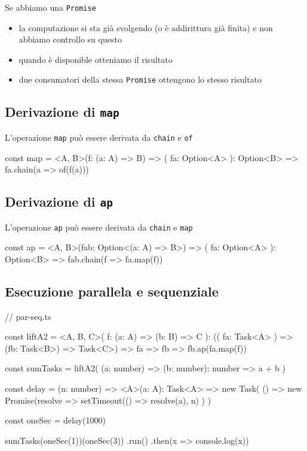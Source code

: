 \documentclass[12pt]{article}
\theoremstyle{definition}
\newenvironment{code}
  {\vspace{0.5cm} \VerbatimEnvironment\begin{typescriptcode}}
  {\end{typescriptcode} \vspace{0.2cm}}
\begin{document}
Se abbiamo una \texttt{Promise}

\begin{itemize}
  \item la computazione si sta già svolgendo (o è addirittura già finita) e non abbiamo controllo su questo
  \item quando è disponible otteniamo il risultato
  \item due consumatori della stessa \texttt{Promise} ottengono lo stesso risultato
\end{itemize}

\subsection{Derivazione di \texttt{map}}

L'operazione \texttt{map} può essere derivata da \texttt{chain} e \texttt{of}

\begin{code}
const map = <A, B>(f: (a: A) => B) => (
  fa: Option<A>
): Option<B> => fa.chain(a => of(f(a)))
\end{code}

\subsection{Derivazione di \texttt{ap}}

L'operazione \texttt{ap} può essere derivata da \texttt{chain} e \texttt{map}

\begin{code}
const ap = <A, B>(fab: Option<(a: A) => B>) => (
  fa: Option<A>
): Option<B> => fab.chain(f => fa.map(f))
\end{code}

\subsection{Esecuzione parallela e sequenziale}

\begin{code}
// par-seq.ts

const liftA2 = <A, B, C>(
  f: (a: A) => (b: B) => C
): ((
  fa: Task<A>
) => (fb: Task<B>) => Task<C>) => fa => fb =>
  fb.ap(fa.map(f))

const sumTasks = liftA2(
  (a: number) => (b: number): number => a + b
)

const delay = (n: number) => <A>(a: A): Task<A> =>
  new Task(
    () =>
      new Promise(resolve => {
        setTimeout(() => resolve(a), n)
      })
  )

const oneSec = delay(1000)

sumTasks(oneSec(1))(oneSec(3))
  .run()
  .then(x => console.log(x))
\end{code}
\end{document}
